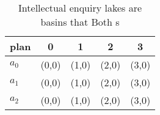 \documentclass[a4paper]{article}
\begin{document}
\begin{table}
\begin{adjustbox}{width=0.5\columnwidth}
\begin{tabular}{|l|l|l|l|l|}
\hline
\textbf{plan} & \multicolumn{1}{c|}{\textbf{0}} & \multicolumn{1}{c|}{\textbf{1}} & \multicolumn{1}{c|}{\textbf{2}} & \multicolumn{1}{c|}{\textbf{3}} \\ \hline
\textbf{$a_0$}  & (0,0) & (1,0) & (2,0) & (3,0) \\ \hline
\textbf{$a_1$}  & (0,0) & (1,0) & (2,0) & (3,0) \\ \hline
\textbf{$a_2$}  & (0,0) & (1,0) & (2,0) & (3,0) \\ \hline
\end{tabular}
\end{adjustbox}
\caption{Intellectual enquiry lakes are basins that Both s
}
\end{table}
\end{document}
